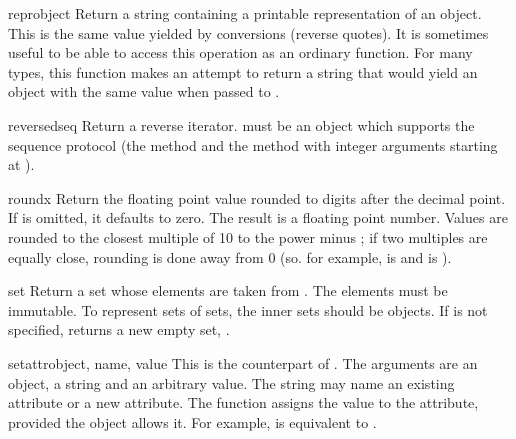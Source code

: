 \begin{funcdesc}{repr}{object}
  Return a string containing a printable representation of an object.
  This is the same value yielded by conversions (reverse quotes).
  It is sometimes useful to be able to access this operation as an
  ordinary function.  For many types, this function makes an attempt
  to return a string that would yield an object with the same value
  when passed to .
\end{funcdesc}

\begin{funcdesc}{reversed}{seq}
  Return a reverse iterator.   must be an object which
  supports the sequence protocol (the  method and the
   method with integer arguments starting at
  ).
\end{funcdesc}

\begin{funcdesc}{round}{x}
  Return the floating point value  rounded to  digits
  after the decimal point.  If  is omitted, it defaults to zero.
  The result is a floating point number.  Values are rounded to the
  closest multiple of 10 to the power minus ; if two multiples
  are equally close, rounding is done away from 0 (so. for example,
   is  and  is ).
\end{funcdesc}

\begin{funcdesc}{set}{}
  Return a set whose elements are taken from .  The elements
  must be immutable.  To represent sets of sets, the inner sets should
  be  objects.  If  is not specified,
  returns a new empty set, .
\end{funcdesc}

\begin{funcdesc}{setattr}{object, name, value}
  This is the counterpart of .  The arguments are an
  object, a string and an arbitrary value.  The string may name an
  existing attribute or a new attribute.  The function assigns the
  value to the attribute, provided the object allows it.  For example,
   is equivalent to
  .
\end{funcdesc}

